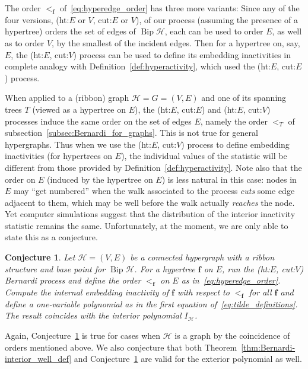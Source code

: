 \documentclass[10pt]{amsart}
\newtheorem{conj}[theo]{Conjecture}
\theoremstyle{definition}\newtheorem{defi}[theo]{Definition}
\theoremstyle{remark}\newtheorem{rema}[theo]{Remark}
\newcommand{\HH}{\mathcal H}
\DeclareMathOperator{\bip}{Bip}
\begin{document}
The order $<_{\mathbf f}$ of~\eqref{eq:hyperedge_order} has three more variants: Since any of the four versions, (ht:$E$ or $V$, cut:$E$ or $V$), of our process (assuming the presence of a hypertree) orders the set of edges of $\bip\HH$, each can be used to order $E$, as well as to order $V$, by the smallest of the incident edges. Then for a hypertree on, say, $E$, the (ht:$E$, cut:$V$) process can be used to define its embedding inactivities in complete analogy with Definition~\ref{def:hyperactivity}, which used the (ht:$E$, cut:$E$) process.

When applied to a (ribbon) graph $\HH=G=(V,E)$ and one of its spanning trees $T$ (viewed as a hypertree on $E$), the (ht:$E$, cut:$E$) and (ht:$E$, cut:$V$) processes induce the same order on the set of edges $E$, namely the order $<_T$ of subsection~\ref{subsec:Bernardi_for_graphs}. This is not true for general hypergraphs. Thus when we use the (ht:$E$, cut:$V$) process to define embedding inactivities (for hypertrees on $E$), the individual values of the statistic will be different from those provided by Definition~\ref{def:hyperactivity}. Note also that the order on $E$ (induced by the hypertree on $E$) is less natural in this case: nodes in $E$ may ``get numbered'' when the walk associated to the process \emph{cuts} some edge adjacent to them, which may be well before the walk actually \emph{reaches} the node. Yet computer simulations suggest that the distribution of the interior inactivity statistic remains the same. Unfortunately, at the moment, we are only able to state this as a conjecture.

\begin{conj}
\label{conj:interior_cutatvertex}
Let $\HH=(V,E)$ be a connected hypergraph with a ribbon structure and base point for $\bip\HH$. For a hypertree $\mathbf f$ on $E$, run the (ht:$E$, cut:$V$) Bernardi process and define the order $<_{\mathbf f}$ on $E$ as in~\eqref{eq:hyperedge_order}. Compute the internal embedding inactivity of $\mathbf f$ with respect to $<_{\mathbf f}$ for all $\mathbf f$ and define a one-variable polynomial as in the first equation of~\eqref{eq:tilde_definitions}. The result coincides with the interior polynomial $I_\HH$. 
\end{conj}

Again, Conjecture~\ref{conj:interior_cutatvertex} is true for cases when $\HH$ is a graph by the coincidence of orders mentioned above. We also conjecture that both Theorem~\ref{thm:Bernardi-interior_well_def} and Conjecture~\ref{conj:interior_cutatvertex} are valid for the exterior polynomial as well.
\end{document}
